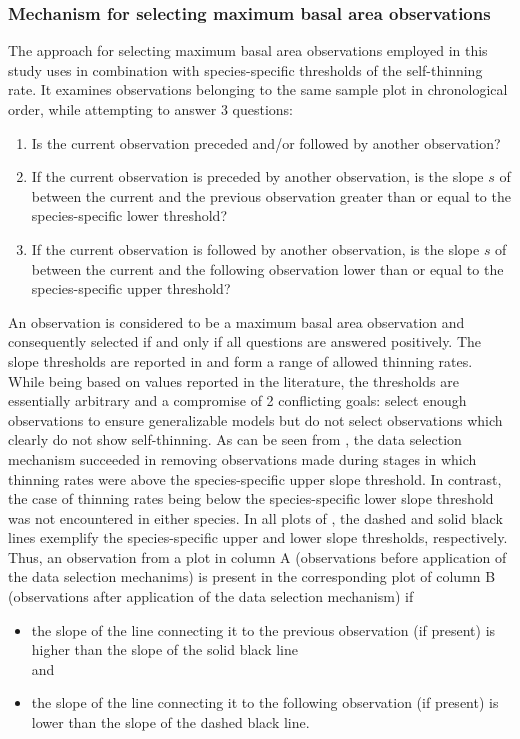 \subsubsection{Mechanism for selecting maximum basal area observations}

The approach for selecting maximum basal area observations employed in this study uses  in combination with species-specific thresholds of the self-thinning rate.  It examines observations belonging to the same sample plot in chronological order, while attempting to answer 3 questions:
\begin{enumerate}
\item Is the current observation preceded and/or followed by another observation?
\item If the current observation is preceded by another observation, is the slope \(s\) of  between the current and the previous observation greater than or equal to the species-specific lower threshold?
\item If the current observation is followed by another observation, is the slope \(s\) of  between the current and the following observation lower than or equal to the species-specific upper threshold?
\end{enumerate}
An observation is considered to be a maximum basal area observation and consequently selected if and only if all questions are answered positively.  The slope thresholds are reported in  and form a range of allowed thinning rates.  While being based on values reported in the literature, the thresholds are essentially arbitrary and a compromise of 2 conflicting goals: select enough observations to ensure generalizable models but do not select observations which clearly do not show self-thinning.  As can be seen from , the data selection mechanism succeeded in removing observations made during stages in which thinning rates were above the species-specific upper slope threshold.  In contrast, the case of thinning rates being below the species-specific lower slope threshold was not encountered in either species.
In all plots of , the dashed and solid black lines exemplify the species-specific upper and lower slope thresholds, respectively.  Thus, an observation from a plot in column A (observations before application of the data selection mechanims) is present in the corresponding plot of column B (observations after application of the data selection mechanism) if
\begin{itemize}
\item the slope of the line connecting it to the previous observation (if present) is higher than the slope of the solid black line \\
  and
\item the slope of the line connecting it to the following observation (if present) is lower than the slope of the dashed black line.
\end{itemize}

